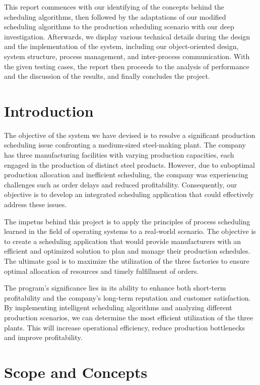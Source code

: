 \documentclass[a4paper, 12pt]{article}
\begin{document}
This report commences with our identifying of the concepts behind the scheduling algorithms, then followed by the adaptations of our modified scheduling algorithms to the production scheduling scenario with our deep investigation.
Afterwards, we display various technical details during the design and the implementation of the system, including our object-oriented design, system structure, process management, and inter-process communication.
With the given testing cases, the report then proceeds to the analysis of performance and the discussion of the results, and finally concludes the project.

\section{Introduction}

The objective of the system we have devised is to resolve a significant production scheduling issue confronting a medium-sized steel-making plant. 
The company has three manufacturing facilities with varying production capacities, each engaged in the production of distinct steel products. 
However, due to suboptimal production allocation and inefficient scheduling, the company was experiencing challenges such as order delays and reduced profitability. 
Consequently, our objective is to develop an integrated scheduling application that could effectively address these issues.

The impetus behind this project is to apply the principles of process scheduling learned in the field of operating systems to a real-world scenario. 
The objective is to create a scheduling application that would provide manufacturers with an efficient and optimized solution to plan and manage their production schedules. 
The ultimate goal is to maximize the utilization of the three factories to ensure optimal allocation of resources and timely fulfillment of orders.

The program's significance lies in its ability to enhance both short-term profitability and the company's long-term reputation and customer satisfaction. 
By implementing intelligent scheduling algorithms and analyzing different production scenarios, we can determine the most efficient utilization of the three plants. 
This will increase operational efficiency, reduce production bottlenecks and improve profitability. 


\section{Scope and Concepts}
\end{document}
